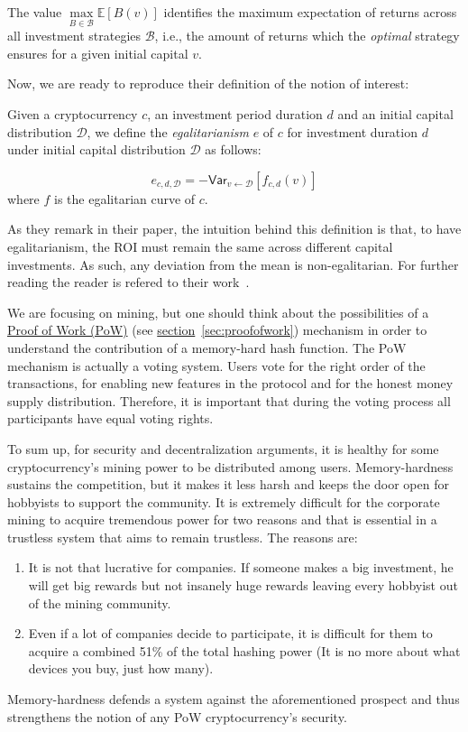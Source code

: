The value $\underset{B \in \mathcal{B}}{\max}{\mathbb{E}[B(v)]}$ identifies the maximum expectation of
returns across all investment strategies $\mathcal{B}$, i.e., the amount of
returns which the \emph{optimal} strategy ensures for a given initial capital $v$.
\pagebreak

\noindent Now, we are ready to reproduce their definition of the notion of interest:

\begin{definition}[Egalitarianism]
  Given a cryptocurrency $c$, an investment period duration $d$ and an initial
  capital distribution $\mathcal{D}$, we define the \emph{egalitarianism} $e$ of $c$
  for investment duration $d$ under initial capital distribution $\mathcal{D}$
  as follows:

  \begin{equation} \nonumber
    e_{c,d,\mathcal{D}} = -\textsf{Var}_{v \gets \mathcal{D}}[f_{c,d}(v)]
  \end{equation}
  where $f$ is the egalitarian curve of $c$.
\end{definition}

As they remark in their paper, the intuition behind this definition is that, to have egalitarianism, the ROI must remain the same across different capital investments. As such, any deviation from the mean is non-egalitarian. For further reading the reader is refered to their work~\cite{egalitarianism}.

We are focusing on mining, but one should think about the possibilities of a \hyperref[sec:proofofwork]{Proof of Work (PoW)} (see \hyperref[sec:proofofwork]{section}~\ref{sec:proofofwork}) mechanism in order to understand the contribution of a memory-hard hash function. The PoW mechanism is actually a voting system. Users vote for the right order of the transactions, for enabling new features in the protocol and for the honest money supply distribution. Therefore, it is important that during the voting process all participants have equal voting rights.

To sum up, for security and decentralization arguments, it is healthy for some cryptocurrency's mining power to be distributed among users. Memory-hardness sustains the competition, but it makes it less harsh and keeps the door open for hobbyists to support the community. It is extremely difficult for the corporate mining to acquire tremendous power for two reasons and that is essential in a trustless system that aims to remain trustless. The reasons are:
\begin{enumerate}[label=(\greek*)]
  \item It is not that lucrative for companies. If someone makes a big investment, he will get big rewards but not insanely huge rewards leaving every hobbyist out of the mining community.
  \item Even if a lot of companies decide to participate, it is difficult for them to acquire a combined 51\% of the total hashing power (It is no more about what devices you buy, just how many).
\end{enumerate}

Memory-hardness defends a system against the aforementioned prospect and thus strengthens the notion of any PoW cryptocurrency's security.
